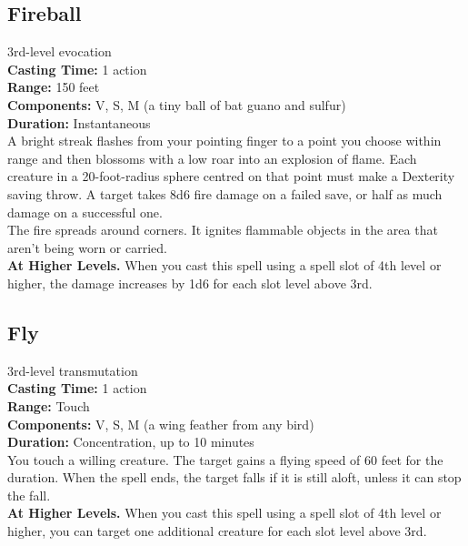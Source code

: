 \documentclass[11pt, A4paper, english]{article}
\begin{document}
		\subsection{Fireball}
3rd-level evocation \\
\textbf{Casting Time:} 1 action \\
\textbf{Range:} 150 feet \\
\textbf{Components:} V, S, M (a tiny ball of bat guano and sulfur) \\
\textbf{Duration:} Instantaneous \\
A bright streak flashes from your pointing finger to a point you choose within range and then blossoms with a low roar into an explosion of flame. Each creature in a 20-foot-radius sphere centred on that point must make a Dexterity saving throw. A target takes 8d6 fire damage on a failed save, or half as much damage on a successful one. \\
The fire spreads around corners. It ignites flammable objects in the area that aren't being worn or carried. \\
\textbf{At Higher Levels.} When you cast this spell using a spell slot of 4th level or higher, the damage increases by 1d6 for each slot level above 3rd.

		\subsection{Fly}
3rd-level transmutation \\
\textbf{Casting Time:} 1 action \\
\textbf{Range:} Touch \\
\textbf{Components:} V, S, M (a wing feather from any bird) \\
\textbf{Duration:} Concentration, up to 10 minutes \\
You touch a willing creature. The target gains a flying speed of 60 feet for the duration. When the spell ends, the target falls if it is still aloft, unless it can stop the fall. \\
\textbf{At Higher Levels.} When you cast this spell using a spell slot of 4th level or higher, you can target one additional creature for each slot level above 3rd.
\end{document}
